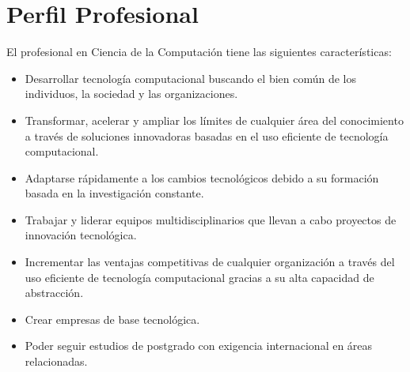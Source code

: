 \section{Perfil Profesional}\label{sec:professional-profile}
El profesional en Ciencia de la Computación tiene las siguientes caracterí­sticas:

\begin{itemize}
\item Desarrollar tecnologí­a computacional buscando el bien común de los individuos, la sociedad y las organizaciones.
\item Transformar, acelerar y ampliar los lí­mites de cualquier área del conocimiento a través de soluciones innovadoras basadas en el uso eficiente de tecnologí­a computacional.
\item Adaptarse rápidamente a los cambios tecnológicos debido a su formación basada en la investigación constante.
\item Trabajar y liderar equipos multidisciplinarios que llevan a cabo proyectos de innovación tecnológica.
\item Incrementar las ventajas competitivas de cualquier organización a través del uso eficiente de tecnologí­a computacional gracias a su alta capacidad de abstracción.
\item Crear empresas de base tecnológica.
\item Poder seguir estudios de postgrado con exigencia internacional en áreas relacionadas.
\end{itemize}

